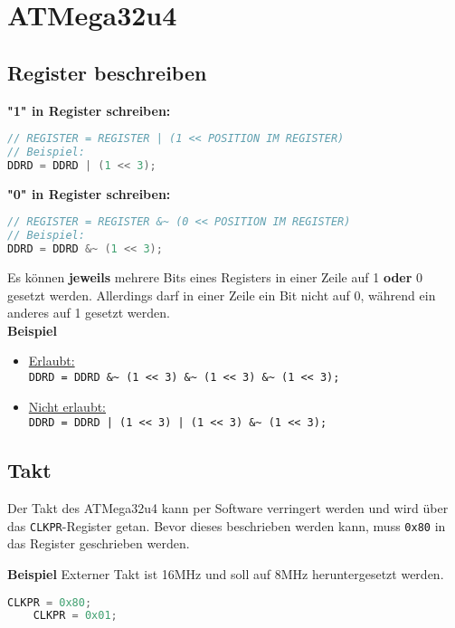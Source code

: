 \chapter{ATMega32u4}
\section{Register beschreiben}
\textbf{"1" in Register schreiben:}
\begin{lstlisting}[language=C]
// REGISTER = REGISTER | (1 << POSITION IM REGISTER)
// Beispiel:
DDRD = DDRD | (1 << 3);
\end{lstlisting}

\textbf{"0" in Register schreiben:}
\begin{lstlisting}[language=C]
// REGISTER = REGISTER &~ (0 << POSITION IM REGISTER)
// Beispiel:
DDRD = DDRD &~ (1 << 3);
\end{lstlisting}

Es können \textbf{jeweils} mehrere Bits eines Registers in einer Zeile auf 1 \textbf{oder} 0 gesetzt werden. Allerdings darf in einer Zeile ein Bit nicht auf 0, während ein anderes auf 1 gesetzt werden.\\

\textbf{Beispiel}
\begin{itemize}
    \item \underline{Erlaubt:} \\
    \verb|DDRD = DDRD &~ (1 << 3) &~ (1 << 3) &~ (1 << 3);|
    \item \underline{Nicht erlaubt:} \\
    \verb$DDRD = DDRD | (1 << 3) | (1 << 3) &~ (1 << 3);$
\end{itemize}

\newpage

\section{Takt}
Der Takt des ATMega32u4 kann per Software verringert werden und wird über das \verb|CLKPR|-Register getan. Bevor dieses beschrieben werden kann, muss \verb|0x80| in das Register geschrieben werden.

\textbf{Beispiel}
Externer Takt ist 16MHz und soll auf 8MHz heruntergesetzt werden.
\begin{lstlisting}[language=C]
    CLKPR = 0x80;
    CLKPR = 0x01;
\end{lstlisting}

